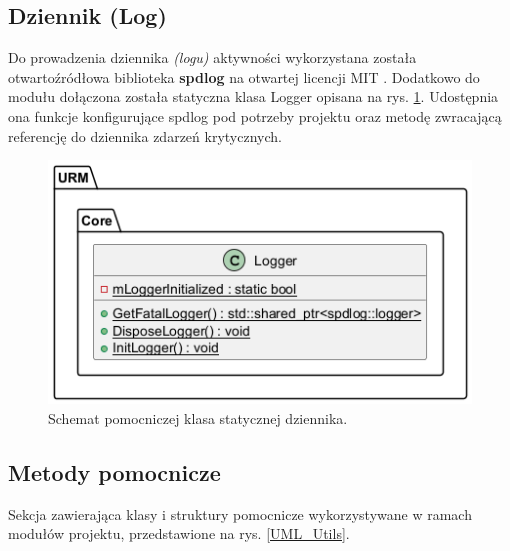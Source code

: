 	\vfill
	\clearpage
	
\subsection{Dziennik (Log)}
	Do prowadzenia dziennika \textit{(logu)} aktywności wykorzystana została otwartoźródłowa biblioteka \textbf{spdlog} na otwartej licencji MIT \cite{github:spdlog:spdlog}. Dodatkowo do modułu dołączona została statyczna klasa Logger opisana na rys. \ref{UML_Logger}. Udostępnia ona funkcje konfigurujące spdlog pod potrzeby projektu oraz metodę zwracającą referencję do dziennika zdarzeń krytycznych.
	

	\begin{figure}[h!]
		\centering
		\includegraphics[width=\textwidth]{images/UML/logging.png}
		\caption{Schemat pomocniczej klasa statycznej dziennika.}
		\label{UML_Logger}
	\end{figure}
	
	\vfill
	\clearpage
	
\subsection{Metody pomocnicze}
	Sekcja zawierająca klasy i struktury pomocnicze wykorzystywane w ramach modułów projektu, przedstawione na rys. \ref{UML_Utils}.
	
